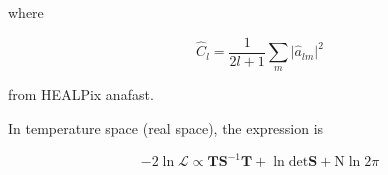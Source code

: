 \documentclass[a4paper, 11pt]{article}
\begin{document}
where 

\begin{equation}
\hat{C}_l=\frac{1}{2l+1}\sum_m \vert\hat{a}_{lm}\vert^2
\end{equation}

from HEALPix anafast. 


In temperature space (real space), the expression is

\begin{equation}
-2 \ln\mathcal{L}\propto\textbf{T}\textbf{S}^{-1}\textbf{T}+\ln\text{det}\textbf{S}+\text{N}\ln2\pi
\end{equation}
\end{document}
